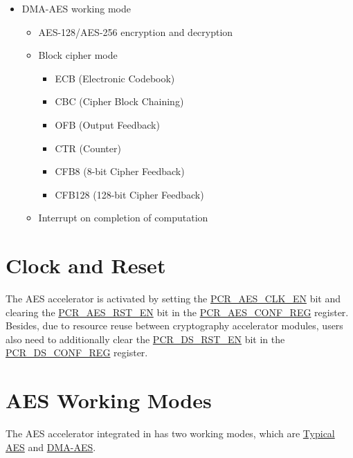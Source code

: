 \documentclass[main\_\_EN.tex]{subfiles}
\begin{document}
    \begin{itemize}
    \item DMA-AES working mode
        \begin{itemize}
            \item AES-128/AES-256 encryption and decryption
            \item Block cipher mode
                \begin{itemize}
                    \item ECB (Electronic Codebook)
                    \item CBC (Cipher Block Chaining)
                    \item OFB (Output Feedback)
                    \item CTR (Counter)
                    \item CFB8 (8-bit Cipher Feedback)
                    \item CFB128 (128-bit Cipher Feedback)
                \end{itemize}
            \item Interrupt on completion of computation    
        \end{itemize}
    \end{itemize}

\section{Clock and Reset}

The AES accelerator is activated by setting the \hyperref[fielddesc:PCRAESCLKEN]{PCR\_AES\_CLK\_EN} bit and clearing the \hyperref[fielddesc:PCRAESRSTEN]{PCR\_AES\_RST\_EN} bit in the \hyperref[regdesc:PCRAESCONFREG]{PCR\_AES\_CONF\_REG} register. Besides, due to resource reuse between cryptography accelerator modules, users also need to additionally clear the \hyperref[fielddesc:PCRDSRSTEN]{PCR\_DS\_RST\_EN} bit in the \hyperref[regdesc:PCRDSCONFREG]{PCR\_DS\_CONF\_REG} register.



\section{AES Working Modes}

The AES accelerator integrated in \chipname{} has two working modes, which are \hyperref[sec:aes-typical-modes]{Typical AES} and \hyperref[sec:aes-dma-aes]{DMA-AES}.
\end{document}
